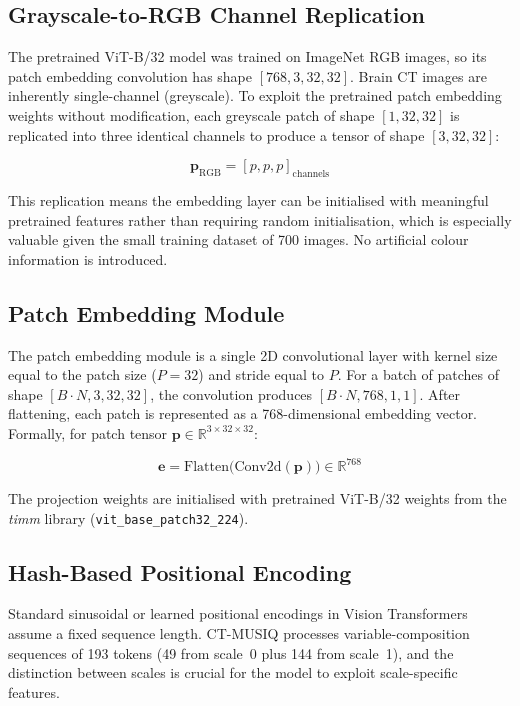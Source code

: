 \subsection{Grayscale-to-RGB Channel Replication}

The pretrained ViT-B/32 model was trained on ImageNet RGB images, so its patch embedding
convolution has shape $[768, 3, 32, 32]$. Brain CT images are inherently single-channel
(greyscale). To exploit the pretrained patch embedding weights without modification, each
greyscale patch of shape $[1, 32, 32]$ is replicated into three identical channels to
produce a tensor of shape $[3, 32, 32]$:

\begin{equation}
    \mathbf{p}_{\text{RGB}} = [p, p, p]_{\text{channels}}
\end{equation}

This replication means the embedding layer can be initialised with meaningful pretrained
features rather than requiring random initialisation, which is especially valuable given
the small training dataset of 700 images. No artificial colour information is introduced.

\subsection{Patch Embedding Module}

The patch embedding module is a single 2D convolutional layer with kernel size equal to
the patch size ($P = 32$) and stride equal to $P$. For a batch of patches of shape
$[B \cdot N, 3, 32, 32]$, the convolution produces $[B \cdot N, 768, 1, 1]$. After
flattening, each patch is represented as a 768-dimensional embedding vector. Formally,
for patch tensor $\mathbf{p} \in \mathbb{R}^{3 \times 32 \times 32}$:

\begin{equation}
    \mathbf{e} = \text{Flatten}\bigl(\text{Conv2d}(\mathbf{p})\bigr) \in \mathbb{R}^{768}
\end{equation}

The projection weights are initialised with pretrained ViT-B/32 weights from the
\textit{timm} library (\texttt{vit\_base\_patch32\_224}).

\subsection{Hash-Based Positional Encoding}

Standard sinusoidal or learned positional encodings in Vision Transformers assume a
fixed sequence length. CT-MUSIQ processes variable-composition sequences of 193 tokens
(49 from scale~0 plus 144 from scale~1), and the distinction between scales is crucial
for the model to exploit scale-specific features.

